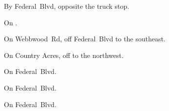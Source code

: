 
\begin{LocationList}

By  Federal~Blvd, opposite the truck stop.

On  .

On Webbwood~Rd, off   Federal~Blvd to the southeast.

On Country Acres, off   to the northwest.

\Location{\TruckStop \Gas \Rest \Service}
On  Federal~Blvd.

On   Federal~Blvd.

On   Federal~Blvd.

\end{LocationList}
